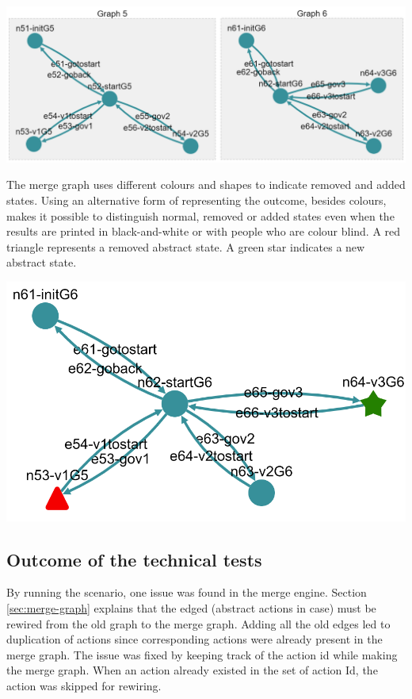 \begingroup
\captionsetup{type=figure}
\includegraphics[scale=0.5]{images/6-test-graph-5-6.png}
\label{fig:bigger-test-graphs}
\endgroup

The merge graph uses different colours and shapes to indicate removed and added states. Using an alternative form of representing the outcome, besides colours, makes it possible to distinguish normal, removed or added states even when the results are printed in black-and-white or with people who are colour blind. A red triangle represents a removed abstract state. A green star indicates a new abstract state.

\begingroup
\captionsetup{type=figure}
\includegraphics[scale=0.5]{images/6-merge-result.png}
\label{fig:test-merged-graph}
\endgroup


\subsection{Outcome of the technical tests}
By running the scenario, one issue was found in the merge engine. Section \ref{sec:merge-graph} explains that the edged (abstract actions in \testar case) must be rewired from the old graph to the merge graph. Adding all the old edges led to duplication of actions since corresponding actions were already present in the merge graph. The issue was fixed by keeping track of the action id while making the merge graph. When an action already existed in the set of action Id, the action was skipped for rewiring. 

